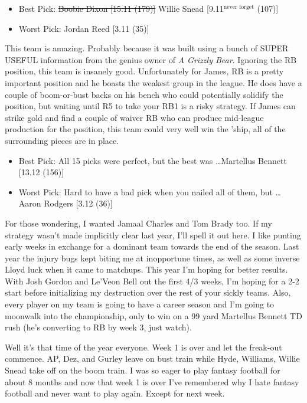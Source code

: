 \documentclass[11pt,letterpaper]{article}
\begin{document}
\newpage
{}
\begin{itemize}
\item Best Pick: \sout{Boobie Dixon [15.11 (179)]} Willie Snead [9.11$^\text{never forget}$ (107)] 
\item Worst Pick: Jordan Reed [3.11 (35)]
\end{itemize}
This team is amazing. Probably because it was built using a bunch of SUPER USEFUL information from the genius owner of \textit{A Grizzly Bear}. Ignoring the RB position, this team is insanely good. Unfortunately for James, RB is a pretty important position and he boasts the weakest group in the league. He does have a couple of boom-or-bust backs on his bench who could potentially solidify the position, but waiting until R5 to take your RB1 is a risky strategy. If James can strike gold and find a couple of waiver RB who can produce mid-league production for the position, this team could very well win the 'ship, all of the surrounding pieces are in place.

\begin{itemize}
\item Best Pick: All 15 picks were perfect, but the best was \dots Martellus Bennett [13.12 (156)]
\item Worst Pick: Hard to have a bad pick when you nailed all of them, but \dots Aaron Rodgers [3.12 (36)]
\end{itemize}
For those wondering, I wanted Jamaal Charles and Tom Brady too. If my strategy wasn't made implicitly clear last year, I'll spell it out here. I like punting early weeks in exchange for a dominant team towards the end of the season. Last year the injury bugs kept biting me at inopportune times, as well as some inverse Lloyd luck when it came to matchups. This year I'm hoping for better results. With Josh Gordon and Le'Veon Bell out the first 4/3 weeks, I'm hoping for a 2-2 start before initializing my destruction over the rest of your sickly teams. Also, every player on my team is going to have a career season and I'm going to moonwalk into the championship, only to win on a 99 yard Martellus Bennett TD rush (he's converting to RB by week 3, just watch).


\newpage
{}

Well it's that time of the year everyone. Week 1 is over and let the freak-out commence. AP, Dez, and Gurley leave on bust train while Hyde, Williams, Willie Snead take off on the boom train. I was so eager to play fantasy football for about 8 months and now that week 1 is over I've remembered why I hate fantasy football and never want to play again. Except for next week.
\end{document}
